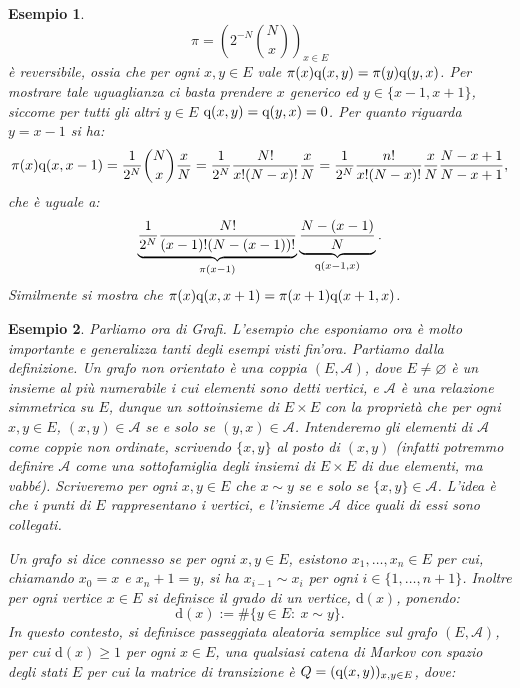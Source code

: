 \documentclass[11pt]{book}
\theoremstyle{Definizione}
\theoremstyle{TeoremaProposizioneLemmaCorollario}
\theoremstyle{OsservazioneNota}
\newtheorem{myes}{Esempio}[section]
\renewcommand{\d}{\mathrm{d}}
\newcommand{\q}{\textup{q}}
\begin{document}
\begin{myes}
$$
\pi = \left(2^{-N}\binom{N}{x}\right)_{x\in E}
$$
è reversibile, ossia che per ogni $x,y\in E$ vale $\pi(x) \q(x,y) = \pi(y)\q(y,x)$. Per mostrare tale uguaglianza ci basta prendere $x$ generico ed $y\in \{x-1,x+1\}$, siccome per tutti gli altri $y\in E$ $\q(x,y) = \q(y,x) = 0$. Per quanto riguarda $y = x-1$ si ha:
$$
\pi(x) \q(x,x-1) = \frac{1}{2^N}\binom{N}{x}\frac{x}{N} = \frac{1}{2^N}\frac{N!}{x!(N-x)!}\frac{x}{N} = \frac{1}{2^N}\frac{n!}{x!(N-x)!}\frac{x}{N}\frac{N-x+1}{N-x+1},
$$
che è uguale a:
$$
\underbrace{\frac{1}{2^N}\frac{N!}{(x-1)!(N-(x-1))!}}_{\pi(x-1)}\underbrace{\frac{N-(x-1)}{N}}_{\q(x-1,x)}.
$$
Similmente si mostra che $\pi(x)\q(x,x+1) = \pi(x+1)\q(x+1,x)$.
\end{myes}
\begin{myes}
Parliamo ora di Grafi. L'esempio che esponiamo ora è molto importante e generalizza tanti degli esempi visti fin'ora. Partiamo dalla definizione. Un grafo non orientato è una coppia $(E,\mathcal{A})$, dove $E\neq \varnothing$ è un insieme al più numerabile i cui elementi sono detti vertici, e $\mathcal{A}$ è una relazione simmetrica su $E$, dunque un sottoinsieme di $E\times E$ con la proprietà che per ogni $x,y\in E$, $(x,y)\in \mathcal{A}$ se e solo se $(y,x)\in \mathcal{A}$. Intenderemo gli elementi di $\mathcal{A}$ come coppie non ordinate, scrivendo $\{x,y\}$ al posto di $(x,y)$ (infatti potremmo definire $\mathcal{A}$ come una sottofamiglia degli insiemi di $E\times E$ di due elementi, ma vabbé). Scriveremo per ogni $x,y\in E$ che $x \sim y$ se e solo se $\{x,y\}\in \mathcal{A}$. L'idea è che i punti di $E$ rappresentano i vertici, e l'insieme $\mathcal{A}$ dice quali di essi sono collegati.
\begin{center}
\end{center}
Un grafo si dice connesso se per ogni $x,y\in E$, esistono $x_1,\dots,x_n\in E$ per cui, chiamando $x_0 = x$ e $x_n+1 = y$, si ha $x_{i-1}\sim x_i$ per ogni $i \in \{1,\dots,n+1\}$. Inoltre per ogni vertice $x\in E$ si definisce il grado di un vertice, $\d(x)$, ponendo:
$$
\d(x) := \#\{y\in E:\ x\sim y\}.
$$
In questo contesto, si definisce passeggiata aleatoria semplice sul grafo $(E,\mathcal{A})$, per cui $\d(x) \geq 1$ per ogni $x\in E$, una qualsiasi catena di Markov con spazio degli stati $E$ per cui la matrice di transizione è $Q = (\q(x,y))_{x,y\in E}$, dove:

\end{myes}
\end{document}

